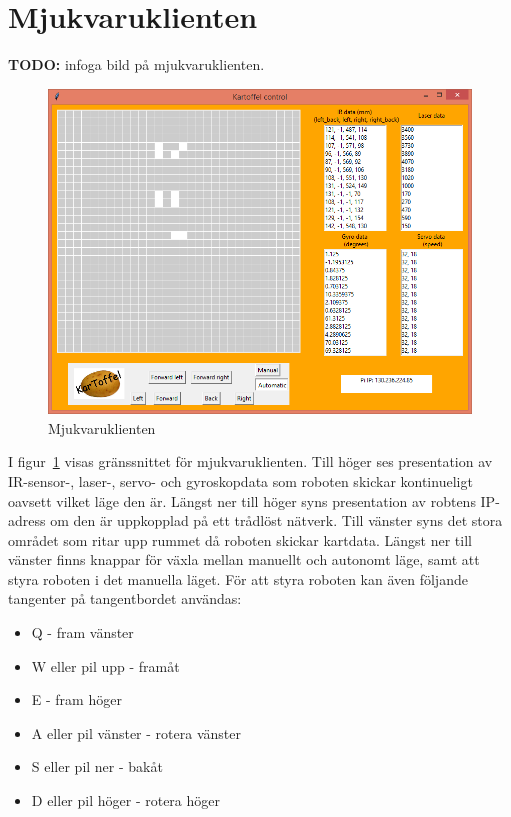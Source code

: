 \documentclass{article}
\begin{document}
\clearpage
\section{Mjukvaruklienten}
\textbf{TODO:} infoga bild på mjukvaruklienten.
\begin{figure}[H]
\centering
\includegraphics[scale=0.55]{client1}
\caption{Mjukvaruklienten}
\label{fig:client1}
\end{figure}
I figur~\ref{fig:client1} visas gränssnittet för mjukvaruklienten. Till höger ses presentation av IR-sensor-, laser-, servo- och gyroskopdata som roboten skickar kontinueligt oavsett vilket läge den är. Längst ner till höger syns presentation av robtens IP-adress om den är uppkopplad på ett trådlöst nätverk. 
Till vänster syns det stora området som ritar upp rummet då roboten skickar kartdata. Längst ner till vänster finns knappar för växla mellan manuellt och autonomt läge, samt att styra roboten i det manuella läget. För att styra roboten kan även följande tangenter på tangentbordet användas:
\begin{itemize}
    \item Q - fram vänster
    \item W eller pil upp - framåt
    \item E - fram höger
    \item A eller pil vänster - rotera vänster
    \item S eller pil ner - bakåt
    \item D eller pil höger - rotera höger
\end{itemize}
\end{document}
